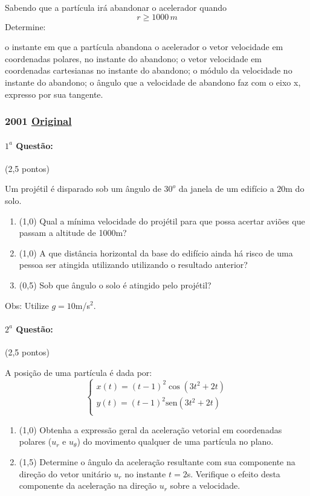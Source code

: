 \documentclass[12pt,a4paper]{article}
\newcommand{\sen}{\mathrm{sen}}
\newcommand{\original}[1]{\tiny \href{#1}{Original} \normalsize}
\begin{document}
\begin{enumerate}
Sabendo que a partícula irá abandonar o acelerador quando $$r\ge 1000\, m$$ Determine:

\begin{tasks}
\task o instante em que a partícula abandona o acelerador
\task o vetor velocidade em coordenadas polares, no instante do abandono;
\task o vetor velocidade em coordenadas cartesianas no instante do abandono;
\task o módulo da velocidade no instante do abandono;
\task o ângulo que a velocidade de abandono faz com o eixo x, expresso por sua tangente.
\end{tasks}


\end{enumerate}

\newpage

\subsubsection{2001 \original{https://drive.google.com/file/d/1Qg7goiVlJvNilTg82hxx2ZEqBK4wA9eq/view?usp=sharing}}

\paragraph{$1^a$ Questão:} (2,5 pontos)

Um projétil é disparado sob um ângulo de $30^o$ da janela de um edifício a $20$m do solo.
\begin{enumerate}[label=\alph*)]
\item (1,0) Qual a mínima velocidade do projétil para que possa acertar aviões que passam a altitude de 1000m?
\item (1,0) A que distância horizontal da base do edifício ainda há risco de uma pessoa ser atingida utilizando utilizando o resultado anterior?
\item (0,5) Sob que ângulo o solo é atingido pelo projétil?
\end{enumerate}

Obs: Utilize $g=10$m/s$^2$.

\paragraph{$2^a$ Questão:} (2,5 pontos)

A posição de uma partícula é dada por:
$$
\begin{cases}
x(t)=(t-1)^2 \cos (3t^2+2t) \\
y(t)=(t-1)^2 \sen (3t^2+2t) \\
\end{cases}
$$
\begin{enumerate}[label=\alph*)]
\item (1,0) Obtenha a expressão geral da aceleração vetorial em coordenadas polares ($u_r$ e $u_\theta$) do movimento qualquer de uma partícula no plano.
\item (1,5) Determine o ângulo da aceleração resultante com sua componente na direção do vetor unitário $u_r$ no instante $t=2$s. Verifique o efeito desta componente
da aceleração na direção $u_r$ sobre a velocidade.
\end{enumerate}
\end{document}
